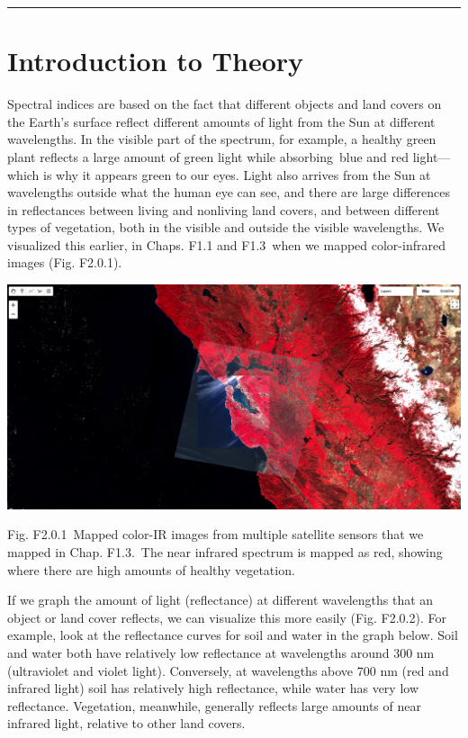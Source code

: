 \documentclass[
  letterpaper,
  DIV=11,
  numbers=noendperiod]{scrreprt}
\begin{document}
\begin{center}\rule{0.5\linewidth}{0.5pt}\end{center}

\hypertarget{introduction-to-theory}{%
\section*{Introduction to Theory}\label{introduction-to-theory}}


Spectral indices are based on the fact that different objects and land
covers on the Earth's surface reflect different amounts of light from
the Sun at different wavelengths. In the visible part of the spectrum,
for example, a healthy green plant reflects a large amount of green
light while absorbing~blue and red light---which is why it appears green
to our eyes. Light also arrives from the Sun at wavelengths outside what
the human eye can see, and there are large differences in reflectances
between living and nonliving land covers, and between different types of
vegetation, both in the visible and outside the visible wavelengths. We
visualized this earlier, in Chaps. F1.1 and F1.3~when we mapped
color-infrared images (Fig. F2.0.1).

\includegraphics{./F2/image39.png}

Fig. F2.0.1~Mapped color-IR images from multiple satellite sensors that
we mapped in Chap. F1.3.~The near infrared spectrum is mapped as red,
showing where there are high amounts of healthy vegetation.

If we graph the amount of light (reflectance) at different wavelengths
that an object or land cover reflects, we can visualize this more easily
(Fig. F2.0.2). For example, look at the reflectance curves for soil and
water in the graph below. Soil and water both have relatively low
reflectance at wavelengths around 300 nm (ultraviolet and violet light).
Conversely, at wavelengths above 700 nm (red and infrared light) soil
has relatively high reflectance, while water has very low reflectance.
Vegetation, meanwhile, generally reflects large amounts of near infrared
light, relative to other land covers.
\end{document}
